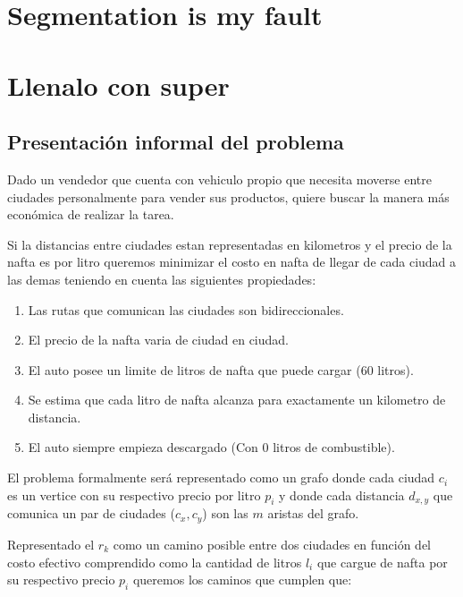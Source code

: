 \documentclass[12pt]{article}
\begin{document}
\section{Segmentation is my fault}





\section{Llenalo con super}

\subsection{Presentación informal del problema}
Dado un vendedor que cuenta con vehiculo propio que necesita moverse entre ciudades personalmente para vender sus productos, quiere buscar la manera más económica de realizar la tarea.

Si la distancias entre ciudades estan representadas en kilometros y el precio de la nafta es por litro queremos minimizar el costo en nafta de llegar de cada ciudad a las demas teniendo en cuenta las siguientes propiedades: 

\begin{enumerate}
	\item Las rutas que comunican las ciudades son bidireccionales.
	\item El precio de la nafta varia de ciudad en ciudad.
	\item El auto posee un limite de litros de nafta que puede cargar (60 litros).
	\item Se estima que cada litro de nafta alcanza para exactamente un kilometro de distancia.
	\item El auto siempre empieza descargado (Con 0 litros de combustible).
\end{enumerate}

El problema formalmente será representado como un grafo donde cada ciudad $c_i$ es un vertice con su respectivo precio por litro $p_i$ y donde cada distancia $d_{x,y}$ que comunica un par de ciudades ($c_x, c_y$) son las $m$ aristas del grafo.

Representado el $r_k$ como un camino posible entre dos ciudades en función del costo efectivo comprendido como la cantidad de litros $l_i$ que cargue de nafta por su respectivo precio $p_i$ queremos los caminos que cumplen que:
\end{document}
